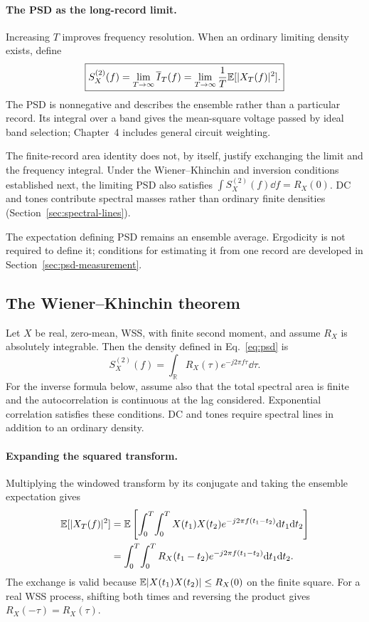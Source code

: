 \paragraph{The PSD as the long-record limit.}
Increasing $T$ improves frequency resolution. When an ordinary limiting density exists, define
\begin{equation}
\boxed{S_X^{(2)}(f)=\lim_{T\to\infty}\overline I_T(f)
=\lim_{T\to\infty}\frac1T\mathbb E[|X_T(f)|^2].}
\label{eq:psd}
\end{equation}
The PSD is nonnegative and describes the ensemble rather than a particular record. Its integral over a band gives the mean-square voltage passed by ideal band selection; Chapter~4 includes general circuit weighting.

The finite-record area identity does not, by itself, justify exchanging the limit and the frequency integral. Under the Wiener--Khinchin and inversion conditions established next, the limiting PSD also satisfies
$\int S_X^{(2)}(f)\dd f=R_X(0)$. DC and tones contribute spectral masses rather than ordinary finite densities (Section~\ref{sec:spectral-lines}).

The expectation defining PSD remains an ensemble average. Ergodicity is not required to define it; conditions for estimating it from one record are developed in Section~\ref{sec:psd-measurement}.

\subsection{The Wiener--Khinchin theorem}
\begin{concept}[title={Wiener--Khinchin theorem for integrable autocorrelation}]
Let $X$ be real, zero-mean, WSS, with finite second moment, and assume $R_X$ is absolutely integrable. Then the density defined in Eq.~\eqref{eq:psd} is
\begin{equation}
\boxed{S_X^{(2)}(f)=\int_{\mathbb R}R_X(\tau)e^{-j2\pi f\tau}\dd\tau.}
\label{eq:wk}
\end{equation}
For the inverse formula below, assume also that the total spectral area is finite and the autocorrelation is continuous at the lag considered. Exponential correlation satisfies these conditions. DC and tones require spectral lines in addition to an ordinary density.
\end{concept}

\paragraph{Expanding the squared transform.}
Multiplying the windowed transform by its conjugate and taking the ensemble expectation gives
\begin{align}
\mathbb E[|X_T(f)|^2]
&=\mathbb E\left[\int_0^T\!\int_0^T X(t_1)X(t_2)e^{-j2\pi f(t_1-t_2)}\mathrm d t_1\mathrm d t_2\right]\notag\\
&=\int_0^T\!\int_0^T R_X(t_1-t_2)e^{-j2\pi f(t_1-t_2)}\mathrm d t_1\mathrm d t_2.
\label{eq:wk-square}
\end{align}
The exchange is valid because $\mathbb E|X(t_1)X(t_2)|\leq R_X(0)$ on the finite square. For a real WSS process, shifting both times and reversing the product gives $R_X(-\tau)=R_X(\tau)$.

